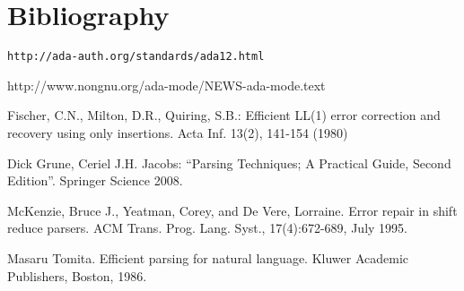 \documentclass{article}
\begin{document}
\section{Bibliography}
\begin{thebibliography}{9}

 \verb|http://ada-auth.org/standards/ada12.html|

 http://www.nongnu.org/ada-mode/NEWS-ada-mode.text

  Fischer, C.N., Milton, D.R., Quiring, S.B.:
  Efficient LL(1) error correction and recovery using only insertions.
  Acta Inf. 13(2), 141-154 (1980)

 Dick Grune, Ceriel J.H. Jacobs: ``Parsing Techniques; A Practical Guide, Second
  Edition''. Springer Science  2008.

 McKenzie, Bruce J., Yeatman, Corey, and De
  Vere, Lorraine. Error repair in shift reduce parsers. ACM Trans.
  Prog. Lang. Syst., 17(4):672-689, July 1995.

 Masaru Tomita. Efficient parsing for natural language. Kluwer Academic Publishers, Boston, 1986.
\end{thebibliography}
\end{document}
